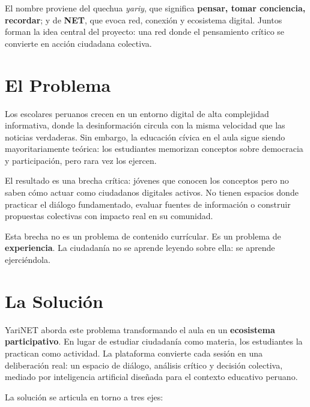 \documentclass[a4paper, 11pt]{article}
\begin{document}
El nombre proviene del quechua \textit{yariy}, que significa \textbf{pensar, tomar
conciencia, recordar}; y de \textbf{NET}, que evoca red, conexi\'{o}n y ecosistema digital.
Juntos forman la idea central del proyecto: una red donde el pensamiento cr\'{i}tico
se convierte en acci\'{o}n ciudadana colectiva.

\section{El Problema}

Los escolares peruanos crecen en un entorno digital de alta complejidad
informativa, donde la desinformaci\'{o}n circula con la misma velocidad que
las noticias verdaderas. Sin embargo, la educaci\'{o}n c\'{i}vica en el aula
sigue siendo mayoritariamente te\'{o}rica: los estudiantes memorizan conceptos
sobre democracia y participaci\'{o}n, pero rara vez los ejercen.

El resultado es una brecha cr\'{i}tica: j\'{o}venes que conocen los conceptos
pero no saben c\'{o}mo actuar como ciudadanos digitales activos. No tienen
espacios donde practicar el di\'{a}logo fundamentado, evaluar fuentes de
informaci\'{o}n o construir propuestas colectivas con impacto real en su
comunidad.

Esta brecha no es un problema de contenido curr\'{i}cular. Es un problema
de \textbf{experiencia}. La ciudadan\'{i}a no se aprende leyendo sobre ella:
se aprende ejerci\'{e}ndola.

\section{La Solución}

YariNET aborda este problema transformando el aula en un \textbf{ecosistema
participativo}. En lugar de estudiar ciudadan\'{i}a como materia, los
estudiantes la practican como actividad. La plataforma convierte cada
sesi\'{o}n en una deliberaci\'{o}n real: un espacio de di\'{a}logo, an\'{a}lisis
cr\'{i}tico y decisi\'{o}n colectiva, mediado por inteligencia artificial
dise\~{n}ada para el contexto educativo peruano.

La soluci\'{o}n se articula en torno a tres ejes:
\end{document}
